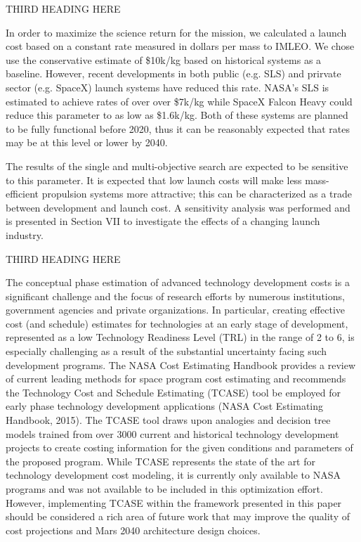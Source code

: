 \documentclass[]{aiaa-pretty}
\begin{document}
THIRD HEADING HERE

In order to maximize the science return for the mission, we calculated a launch cost based on a constant rate measured in dollars per mass to IMLEO. We chose use the conservative estimate of \$10k/kg based on historical systems as a baseline. However, recent developments in both public (e.g. SLS) and prirvate sector (e.g. SpaceX) launch systems have reduced this rate. NASA’s SLS is estimated to achieve rates of over over \$7k/kg while SpaceX Falcon Heavy could reduce this parameter to as low as \$1.6k/kg. \cite{jones2015estimating} Both of these systems are planned to be fully functional before 2020, thus it can be reasonably expected that rates may be at this level or lower by 2040. 

The results of the single and multi-objective search are expected to be sensitive to this parameter. It is expected that low launch costs will make less mass-efficient propulsion systems more attractive; this can be characterized as a trade between development and launch cost. A sensitivity analysis was performed and is presented in Section VII to investigate the effects of a changing launch industry. 	

THIRD HEADING HERE

The conceptual phase estimation of advanced technology development costs is a significant challenge and the focus of research efforts by numerous institutions, government agencies and private organizations. In particular, creating effective cost (and schedule) estimates for technologies at an early stage of development, represented as a low Technology Readiness Level (TRL) in the range of 2 to 6, is especially challenging as a result of the substantial uncertainty facing such development programs. \cite{cole2013technology} The NASA Cost Estimating Handbook provides a review of current leading methods for space program cost estimating and recommends the Technology Cost and Schedule Estimating (TCASE) tool be employed for early phase technology development applications (NASA Cost Estimating Handbook, 2015). The TCASE tool draws upon analogies and decision tree models trained from over 3000 current and historical technology development projects to create costing information for the given conditions and parameters of the proposed program. While TCASE represents the state of the art for technology development cost modeling, it is currently only available to NASA programs and was not available to be included in this optimization effort. However, implementing TCASE within the framework presented in this paper should be considered a rich area of future work that may improve the quality of cost projections and Mars 2040 architecture design choices. 
\end{document}
